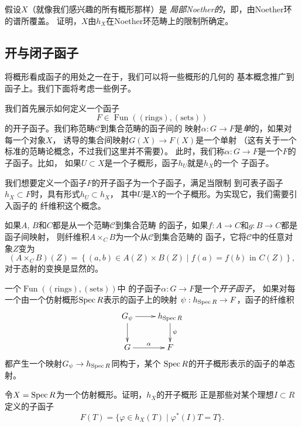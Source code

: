 \begin{exe}
假设$X$（就像我们感兴趣的所有概形那样）是
\textit{局部Noether的}，即，由Noether环的谱所覆盖。
证明，$X$由$h_X$在Noether环范畴上的限制所确定。
\end{exe}

\subsection{开与闭子函子} \label{s:6.1.1}

将概形看成函子的用处之一在于，我们可以将一些概形的几何的
基本概念推广到函子上。我们下面将考虑一些例子。

我们首先展示如何定义一个函子
\[
	F\in \operatorname{Fun}((\text{rings}),(\text{sets}))
\]
的开子函子。我们称范畴$\mathscr C$到集合范畴的函子间的
映射$\alpha:G\to F$是\textit{单}的，如果对每一个对象$X$，
诱导的集合间映射$G(X)\to F(X)$是一个单射
（这有关于一个标准的范畴论概念，不过我们这里并不需要）。
此时，我们称$\alpha:G\to F$是一个$F$的子函子。比如，
如果$U\subset X$是一个子概形，函子$h_U$就是$h_X$的一个
子函子。

我们想要定义一个函子$F$的开子函子为一个子函子，满足当限制
到可表子函子$h_X\subset F$时，具有形式$h_U\subset h_X$，
其中$U$是$X$的一个子概形。为实现它，我们需要引入函子的
纤维积这个概念。

\begin{defi} \label{defi:6.4}
	如果$A$, $B$和$C$都是从一个范畴$\mathscr C$到集合范畴
	的函子，如果$f:A\to C$和$g:B\to C$都是函子间映射，
	则纤维积$A\times_C B$为一个从$\mathscr C$到集合范畴的
	函子，它将$\mathscr C$中的任意对象$Z$变为
	\[
		(A\times_C B)(Z)=\left\{(a,b)\in A(Z)\times B(Z)
		\;|\; f(a)=f(b)\text{ in } C(Z)\right\},
	\]
	对于态射的变换是显然的。
\end{defi}

\begin{defi} \label{defi:6.5}
一个$\operatorname{Fun}((\text{rings}),(\text{sets}))$中
的子函子$\alpha:G\to F$是一个\textit{开子函子}，
如果对每一个由一个仿射概形$\operatorname{Spec} R$表示的函子上的映射
$\psi:h_{\operatorname{Spec} R}\to F$，函子的纤维积
\[
	\xymatrix{
		G_\psi\ar[r]\ar[d]&h_{\spec R}\ar[d]^\psi\\
		G\ar[r]^\alpha& F
	}
\]
都产生一个映射$G_\psi\to h_{\operatorname{Spec} R}$同构于，某个
$\operatorname{Spec} R$的开子概形表示的函子的单态射。
\end{defi}

\begin{exe} \label{exe:6.6}
令$X=\operatorname{Spec} R$为一个仿射概形。证明，$h_X$的开子概形
正是那些对某个理想$I\subset R$定义的子函子
\[
	F(T)=\{\varphi\in h_X(T)\; | \; \varphi^*(I)T=T\}.
\]
\end{exe}


